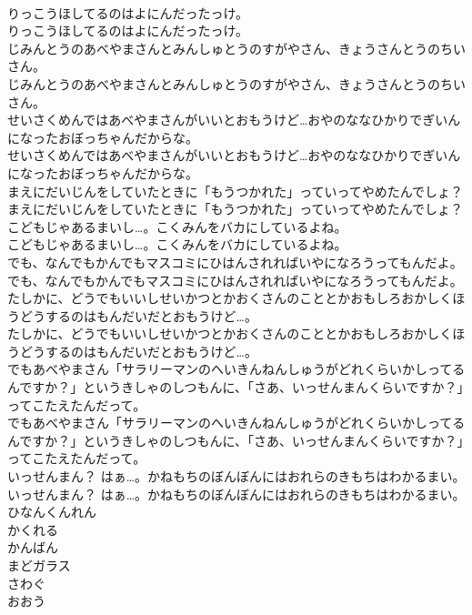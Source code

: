 \documentclass[8pt]{extreport}
\begin{document}
\begin{CJK}{UTF8}{min}
\\	りっこうほしてるのはよにんだったっけ。
\\	りっこうほしてるのはよにんだったっけ。
\\	じみんとうのあべやまさんとみんしゅとうのすがやさん、きょうさんとうのちいさん。
\\	じみんとうのあべやまさんとみんしゅとうのすがやさん、きょうさんとうのちいさん。
\\	せいさくめんではあべやまさんがいいとおもうけど…おやのななひかりでぎいんになったおぼっちゃんだからな。
\\	せいさくめんではあべやまさんがいいとおもうけど…おやのななひかりでぎいんになったおぼっちゃんだからな。
\\	まえにだいじんをしていたときに「もうつかれた」っていってやめたんでしょ？
\\	まえにだいじんをしていたときに「もうつかれた」っていってやめたんでしょ？
\\	こどもじゃあるまいし…。こくみんをバカにしているよね。
\\	こどもじゃあるまいし…。こくみんをバカにしているよね。
\\	でも、なんでもかんでもマスコミにひはんされればいやになろうってもんだよ。
\\	でも、なんでもかんでもマスコミにひはんされればいやになろうってもんだよ。
\\	たしかに、どうでもいいしせいかつとかおくさんのこととかおもしろおかしくほうどうするのはもんだいだとおもうけど…。
\\	たしかに、どうでもいいしせいかつとかおくさんのこととかおもしろおかしくほうどうするのはもんだいだとおもうけど…。
\\	でもあべやまさん「サラリーマンのへいきんねんしゅうがどれくらいかしってるんですか？」というきしゃのしつもんに、「さあ、いっせんまんくらいですか？」ってこたえたんだって。
\\	でもあべやまさん「サラリーマンのへいきんねんしゅうがどれくらいかしってるんですか？」というきしゃのしつもんに、「さあ、いっせんまんくらいですか？」ってこたえたんだって。
\\	いっせんまん？ はぁ…。かねもちのぼんぼんにはおれらのきもちはわかるまい。
\\	いっせんまん？ はぁ…。かねもちのぼんぼんにはおれらのきもちはわかるまい。
\\	ひなんくんれん
\\	かくれる
\\	かんばん
\\	まどガラス
\\	さわぐ
\\	おおう

\end{CJK}
\end{document}
